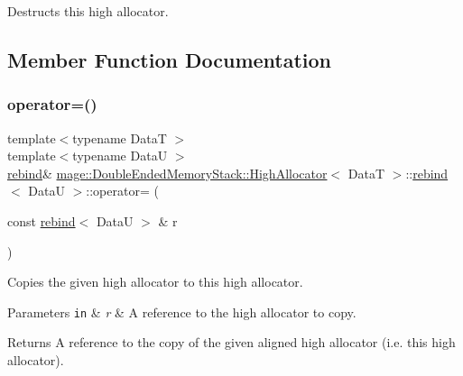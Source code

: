 Destructs this high allocator. 

\subsection{Member Function Documentation}
\hypertarget{structmage_1_1_double_ended_memory_stack_1_1_high_allocator_1_1rebind_a50688a7791fcedde0fd16064dbfa3d13}{}\label{structmage_1_1_double_ended_memory_stack_1_1_high_allocator_1_1rebind_a50688a7791fcedde0fd16064dbfa3d13} 
\subsubsection{\texorpdfstring{operator=()}{operator=()}\hspace{0.1cm}{\footnotesize\ttfamily [1/2]}}
{\footnotesize\ttfamily template$<$typename DataT $>$ \\
template$<$typename DataU $>$ \\
\hyperlink{structmage_1_1_double_ended_memory_stack_1_1_high_allocator_1_1rebind}{rebind}\& \hyperlink{structmage_1_1_double_ended_memory_stack_1_1_high_allocator}{mage\+::\+Double\+Ended\+Memory\+Stack\+::\+High\+Allocator}$<$ DataT $>$\+::\hyperlink{structmage_1_1_double_ended_memory_stack_1_1_high_allocator_1_1rebind}{rebind}$<$ DataU $>$\+::operator= (\begin{DoxyParamCaption}\item[{const \hyperlink{structmage_1_1_double_ended_memory_stack_1_1_high_allocator_1_1rebind}{rebind}$<$ DataU $>$ \&}]{r }\end{DoxyParamCaption})\hspace{0.3cm}{\ttfamily [delete]}}

Copies the given high allocator to this high allocator.


\begin{DoxyParams}[1]{Parameters}
\mbox{\tt in}  & {\em r} & A reference to the high allocator to copy. \\
\hline
\end{DoxyParams}
\begin{DoxyReturn}{Returns}
A reference to the copy of the given aligned high allocator (i.\+e. this high allocator). 
\end{DoxyReturn}
\hypertarget{structmage_1_1_double_ended_memory_stack_1_1_high_allocator_1_1rebind_aff84f83ff696b9e7c2063a492c5256a9}{}\label{structmage_1_1_double_ended_memory_stack_1_1_high_allocator_1_1rebind_aff84f83ff696b9e7c2063a492c5256a9} 
